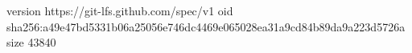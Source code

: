 version https://git-lfs.github.com/spec/v1
oid sha256:a49e47bd5331b06a25056e746dc4469e065028ea31a9cd84b89da9a223d5726a
size 43840
